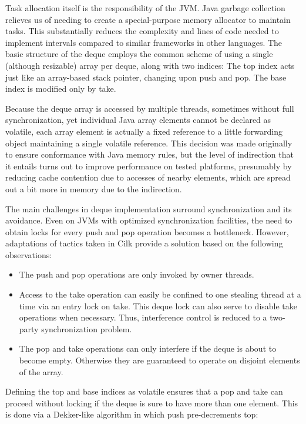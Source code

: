 Task allocation itself is the responsibility of the JVM. Java garbage
collection relieves us of needing to create a special-purpose memory
allocator to maintain tasks. This substantially reduces the complexity
and lines of code needed to implement intervals compared to similar
frameworks in other languages. The basic structure of the deque
employs the common scheme of using a single (although resizable) array
per deque, along with two indices: The top index acts just like an
array-based stack pointer, changing upon push and pop. The base index
is modified only by take.

Because the deque array is accessed by multiple threads, sometimes
without full synchronization, yet individual Java array elements
cannot be declared as volatile, each array element is actually a fixed
reference to a little forwarding object maintaining a single volatile
reference. This decision was made originally to ensure conformance
with Java memory rules, but the level of indirection that it entails
turns out to improve performance on tested platforms, presumably by
reducing cache contention due to accesses of nearby elements, which
are spread out a bit more in memory due to the indirection.

The main challenges in deque implementation surround synchronization
and its avoidance. Even on JVMs with optimized synchronization
facilities, the need to obtain locks for every push and pop operation
becomes a bottleneck.  However, adaptations of tactics taken in Cilk
\cite{Frigo1998} provide a solution based on the following
observations:

\begin{itemize}
\item The push and pop operations are only invoked by owner threads.
\item Access to the take operation can easily be confined to one
  stealing thread at a time via an entry lock on take. This deque lock
  can also serve to disable take operations when necessary. Thus,
  interference control is reduced to a two-party synchronization
  problem.
\item The pop and take operations can only interfere if the deque is
  about to become empty. Otherwise they are guaranteed to operate on
  disjoint elements of the array.
\end{itemize}

Defining the top and base indices as volatile ensures that a pop and
take can proceed without locking if the deque is sure to have more
than one element. This is done via a Dekker-like algorithm in which
push pre-decrements top:

